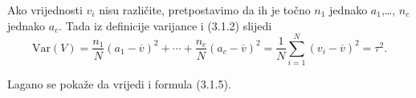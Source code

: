 {Ako vrijednosti $v_{i}$ nisu razli\v{c}ite, pretpostavimo da ih je to\v{c}no
$n_{1}$ jednako $a_{1}$,\dots, $n_{c}$ jednako $a_{c}$. Tada iz definicije
varijance i (3.1.2) slijedi
\begin{equation}
\mathrm{Var}(V) =
\frac{n_{1}}{N} (a_{1}-\overline{v})^2 + \cdots + \frac{n_{c}}{N} (a_{c}-\overline{v})^2 
= \frac{1}{N} \sum_{i=1}^{N} {(v_{i} - \overline{v} )}^2 = {\tau}^2 \mathrm{.}
\end{equation}

Lagano se poka\v{z}e da vrijedi i formula (3.1.5).
}

